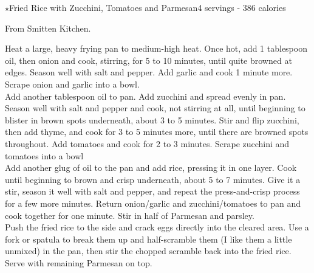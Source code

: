 \begin{recipe}{\texorpdfstring{$\star$}{str}Fried Rice with Zucchini, Tomatoes and Parmesan}{4 servings - 386 calories}{}

\freeform From Smitten Kitchen.


Heat a large, heavy frying pan to medium-high heat. Once hot, add 1 tablespoon oil, then onion and cook, stirring, for 5 to 10 minutes, until quite browned at edges. Season well with salt and pepper. Add garlic and cook 1 minute more. Scrape onion and garlic into a bowl.\\

Add another tablespoon oil to pan. Add zucchini and spread evenly in pan. Season well with salt and pepper and cook, not stirring at all, until beginning to blister in brown spots underneath, about 3 to 5 minutes. Stir and flip zucchini, then add thyme, and cook for 3 to 5 minutes more, until there are browned spots throughout. Add tomatoes and cook for 2 to 3 minutes. Scrape zucchini and tomatoes into a bowl\\

Add another glug of oil to the pan and add rice, pressing it in one layer. Cook until beginning to brown and crisp underneath, about 5 to 7 minutes. Give it a stir, season it well with salt and pepper, and repeat the press-and-crisp process for a few more minutes. Return onion/garlic and zucchini/tomatoes to pan and cook together for one minute. Stir in half of Parmesan and parsley.\\

Push the fried rice to the side and crack eggs directly into the cleared area. Use a fork or spatula to break them up and half-scramble them (I like them a little unmixed) in the pan, then stir the chopped scramble back into the fried rice. Serve with remaining Parmesan on top.

\end{recipe}
